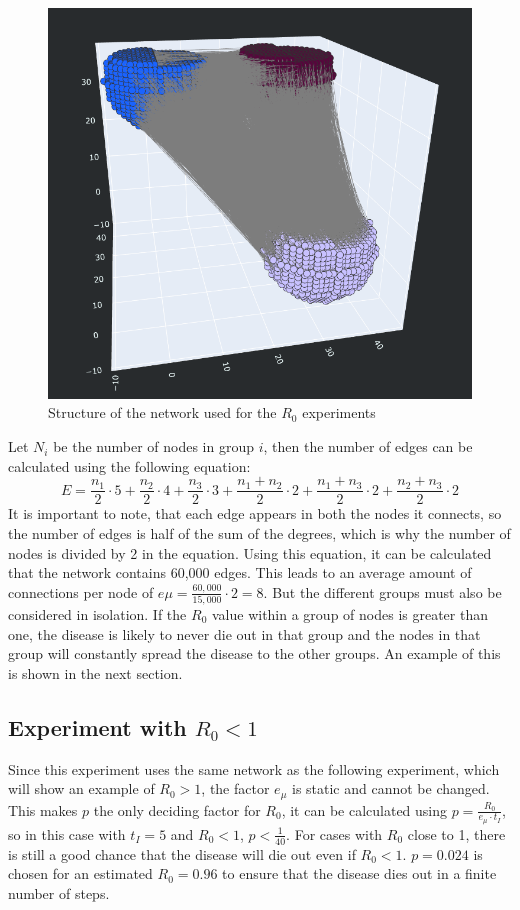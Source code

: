 \begin{figure}
    \centering
    \includegraphics[width=0.75\linewidth]{images/experiment_r0_network.png}
    \caption{Structure of the network used for the $R_0$ experiments}
    \label{fig:exp_r0_network}
\end{figure}

Let $N_i$ be the number of nodes in group $i$, then the number of edges can be calculated using the following equation:
\begin{equation}
    E = \frac{n_1}{2} \cdot 5 + \frac{n_2}{2} \cdot 4 + \frac{n_3}{2} \cdot 3 + \frac{n_1+n_2}{2} \cdot 2 + \frac{n_1+n_3}{2} \cdot 2 + \frac{n_2+n_3}{2} \cdot 2
\end{equation}
It is important to note, that each edge appears in both the nodes it connects, so the number of edges is half of the sum of the degrees, which is why the number of nodes is divided by 2 in the equation. Using this equation, it can be calculated that the network contains 60,000 edges. This leads to an average amount of connections per node of $e\mu=\frac{60,000}{15,000} \cdot 2 = 8$. But the different groups must also be considered in isolation. If the $R_0$ value within a group of nodes is greater than one, the disease is likely to never die out in that group and the nodes in that group will constantly spread the disease to the other groups. An example of this is shown in the next section.

\subsection{Experiment with $R_0 < 1$}
Since this experiment uses the same network as the following experiment, which will show an example of $R_0 > 1$, the factor $e_\mu$ is static and cannot be changed. This makes $p$ the only deciding factor for $R_0$, it can be calculated using $p = \frac{R_0}{e_\mu \cdot t_I}$, so in this case with $t_I=5$ and $R_0 < 1$, $p < \frac{1}{40}$. For cases with $R_0$ close to 1, there is still a good chance that the disease will die out even if $R_0 < 1$. $p=0.024$ is chosen for an estimated $R_0=0.96$ to ensure that the disease dies out in a finite number of steps.

